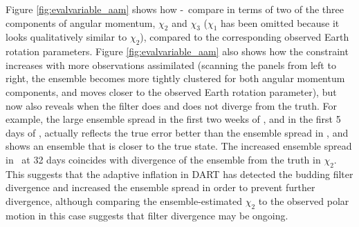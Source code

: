 Figure \ref{fig:evalvariable_aam} shows how  \WACCMNODA-\WACCMGLOBAL~compare in terms of two of the three components of angular momentum, $\chi_2$ and $\chi_3$ ($\chi_1$ has been omitted because it looks qualitatively similar to $\chi_2$),  
compared to the corresponding observed Earth rotation parameters. 
Figure  \ref{fig:evalvariable_aam} also shows how the constraint increases with more observations assimilated (scanning the panels from left to right, the ensemble becomes more tightly clustered for both angular momentum components, and moves closer to the observed Earth rotation parameter), but now also reveals when the filter does and does not diverge from the truth.  
For example, the large ensemble spread in the first two weeks of \WACCMTROPICS, and in the first 5 days of \WACCMGLOBAL, actually reflects the true error better than the ensemble spread in \WACCMNODA, and shows an ensemble that is closer to the true state. 
The increased ensemble spread in \WACCMGLOBAL~at 32 days coincides with divergence of the ensemble from the truth in $\chi_2$. 
This suggests that the adaptive inflation in DART has detected the budding filter divergence and increased the ensemble spread in order to prevent further divergence, although comparing the ensemble-estimated $\chi_2$ to the observed polar motion in this case suggests that filter divergence may be ongoing.  
